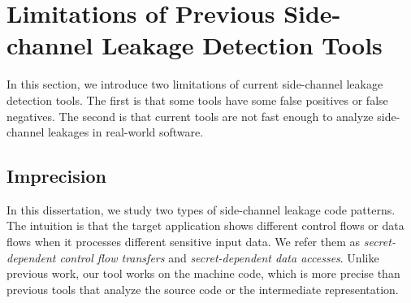 \section{Limitations of Previous Side-channel Leakage Detection Tools}
In this section, we introduce two limitations of current side-channel leakage detection tools. The first is that some tools have some false positives or false negatives. The second is that current tools are not fast enough to analyze side-channel leakages in real-world software.


\subsection{Imprecision}
In this dissertation, we study two types of side-channel leakage code patterns. The intuition is that the target application shows different control flows or data flows when it processes different sensitive input data. We refer them as \textit{secret-dependent control flow transfers} and \textit{secret-dependent data accesses}. Unlike previous work, our tool works on the machine code, which is more precise than previous tools that analyze the source code or the intermediate representation.
